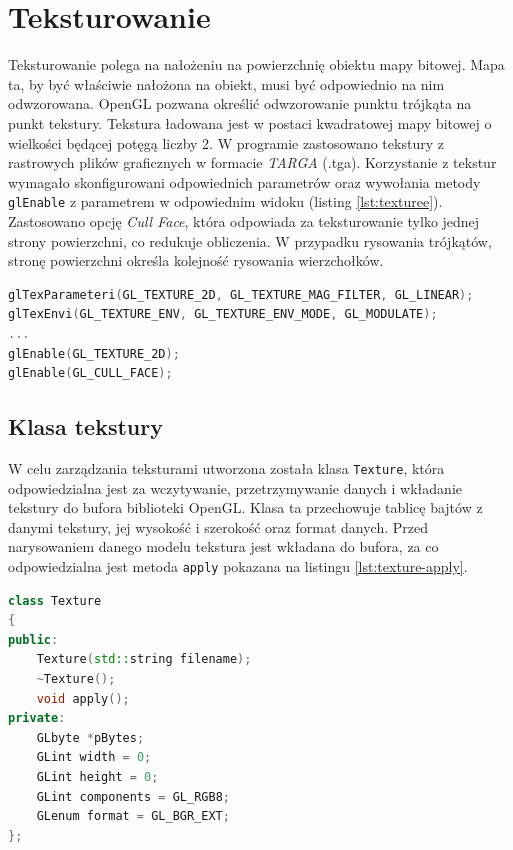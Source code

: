 \newpage
\section{Teksturowanie}
Teksturowanie polega na nałożeniu na powierzchnię obiektu mapy bitowej. Mapa ta, by być właściwie nałożona na obiekt, musi być odpowiednio na nim odwzorowana. OpenGL pozwana określić odwzorowanie punktu trójkąta na punkt tekstury. Tekstura ładowana jest w postaci kwadratowej mapy bitowej o wielkości będącej potęgą liczby 2. W programie zastosowano tekstury z rastrowych plików graficznych w formacie \textit{TARGA} (.tga). 
Korzystanie z tekstur wymagało skonfigurowani odpowiednich parametrów oraz wywołania metody \lstinline{glEnable} z parametrem w odpowiednim widoku (listing \ref{lst:texturee}). Zastosowano opcję \textit{Cull Face}, która odpowiada za teksturowanie tylko jednej strony powierzchni, co redukuje obliczenia. W przypadku rysowania trójkątów, stronę powierzchni określa kolejność rysowania wierzchołków.

\begin{lstlisting}[language=C++, caption=Konfiguracja ustawień teksturowania., label={lst:texturee}]
glTexParameteri(GL_TEXTURE_2D, GL_TEXTURE_MAG_FILTER, GL_LINEAR);
glTexEnvi(GL_TEXTURE_ENV, GL_TEXTURE_ENV_MODE, GL_MODULATE);
...
glEnable(GL_TEXTURE_2D);
glEnable(GL_CULL_FACE);
\end{lstlisting}

\subsection{Klasa tekstury}
W celu zarządzania teksturami utworzona została klasa \lstinline{Texture}, która odpowiedzialna jest za wczytywanie, przetrzymywanie danych i wkładanie tekstury do bufora biblioteki OpenGL. Klasa ta przechowuje tablicę bajtów z danymi tekstury, jej wysokość i szerokość oraz format danych.
Przed narysowaniem danego modelu tekstura jest wkładana do bufora, za co odpowiedzialna jest metoda \lstinline{apply} pokazana na listingu \ref{lst:texture-apply}.
\clearpage
\begin{lstlisting}[language=C++, caption=Definicja klasy \lstinline{Texture}., label={lst:texture}]
class Texture
{
public:
    Texture(std::string filename);
    ~Texture();
    void apply();
private:
    GLbyte *pBytes;
    GLint width = 0;
    GLint height = 0;
    GLint components = GL_RGB8;
    GLenum format = GL_BGR_EXT;
};
\end{lstlisting}


